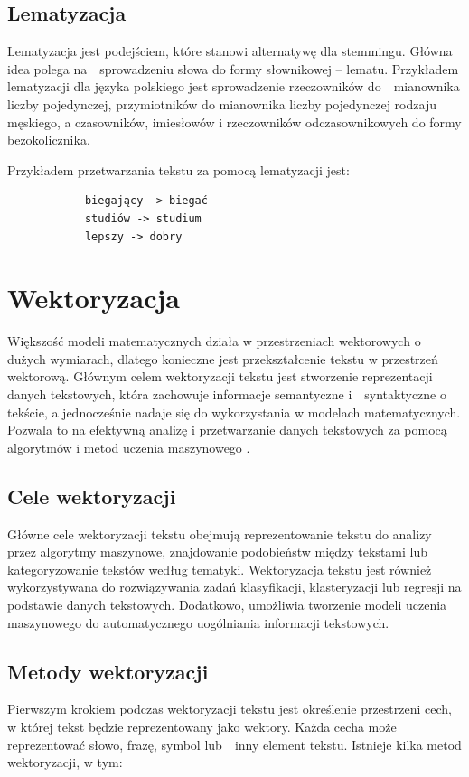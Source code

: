 	\subsection{Lematyzacja}		
		Lematyzacja jest podejściem, które stanowi alternatywę dla stemmingu. Główna idea polega na~~sprowadzeniu słowa do formy słownikowej -- lematu. Przykładem lematyzacji dla języka polskiego jest sprowadzenie rzeczowników do~~mianownika liczby pojedynczej, przymiotników do mianownika liczby pojedynczej rodzaju męskiego, a czasowników, imiesłowów i rzeczowników odczasownikowych do formy bezokolicznika.
		
		Przykładem przetwarzania tekstu za pomocą lematyzacji jest:
		\begin{verbatim}
			biegający -> biegać
			studiów -> studium
			lepszy -> dobry
		\end{verbatim}
		

\section{Wektoryzacja}

	Większość modeli matematycznych działa w przestrzeniach wektorowych o dużych wymiarach, dlatego konieczne jest przekształcenie tekstu w przestrzeń wektorową. Głównym celem wektoryzacji tekstu jest stworzenie reprezentacji danych tekstowych, która zachowuje informacje semantyczne i~~syntaktyczne o tekście, a jednocześnie nadaje się do wykorzystania w modelach matematycznych. Pozwala to na efektywną analizę i przetwarzanie danych tekstowych za pomocą algorytmów i metod uczenia maszynowego \cite{Vectorization}. 

	\subsection{Cele wektoryzacji}				
		Główne cele wektoryzacji tekstu obejmują reprezentowanie tekstu do analizy przez algorytmy maszynowe, znajdowanie podobieństw między tekstami lub kategoryzowanie tekstów według tematyki. Wektoryzacja tekstu jest również wykorzystywana do rozwiązywania zadań klasyfikacji, klasteryzacji lub regresji na podstawie danych tekstowych. Dodatkowo, umożliwia tworzenie modeli uczenia maszynowego do automatycznego uogólniania informacji tekstowych.
		

	\subsection{Metody wektoryzacji}
		Pierwszym krokiem podczas wektoryzacji tekstu jest określenie przestrzeni cech, w której tekst będzie reprezentowany jako wektory. Każda cecha może reprezentować słowo, frazę, symbol lub~~inny element tekstu. Istnieje kilka metod wektoryzacji, w tym:

